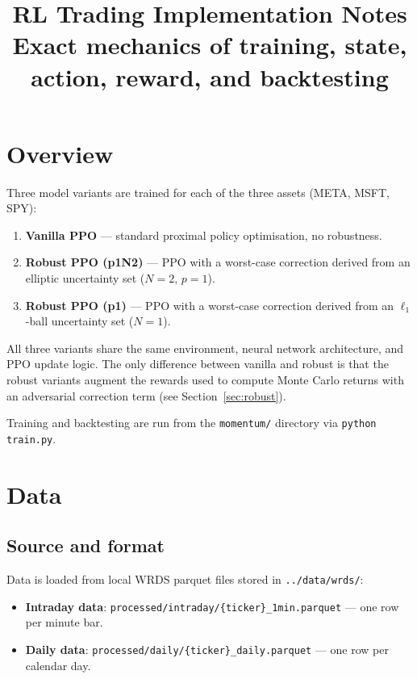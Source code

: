 \documentclass[11pt,a4paper]{article}
\title{\textbf{RL Trading Implementation Notes}\\
\large Exact mechanics of training, state, action, reward, and backtesting}
\author{}
\date{}
\begin{document}
\maketitle
\tableofcontents
\bigskip

\section{Overview}

Three model variants are trained for each of the three assets (META, MSFT, SPY):

\begin{enumerate}
  \item \textbf{Vanilla PPO} --- standard proximal policy optimisation, no robustness.
  \item \textbf{Robust PPO (p1N2)} --- PPO with a worst-case correction derived from an elliptic uncertainty set ($N{=}2,\,p{=}1$).
  \item \textbf{Robust PPO (p1)} --- PPO with a worst-case correction derived from an $\ell_1$-ball uncertainty set ($N{=}1$).
\end{enumerate}

All three variants share the same environment, neural network architecture, and PPO update logic. The only difference between vanilla and robust is that the robust variants augment the rewards used to compute Monte Carlo returns with an adversarial correction term (see Section~\ref{sec:robust}).

Training and backtesting are run from the \texttt{momentum/} directory via \texttt{python train.py}.

\section{Data}

\subsection{Source and format}

Data is loaded from local WRDS parquet files stored in \texttt{../data/wrds/}:
\begin{itemize}
  \item \textbf{Intraday data}: \texttt{processed/intraday/\{ticker\}\_1min.parquet} --- one row per minute bar.
  \item \textbf{Daily data}: \texttt{processed/daily/\{ticker\}\_daily.parquet} --- one row per calendar day.
\end{itemize}
\end{document}
